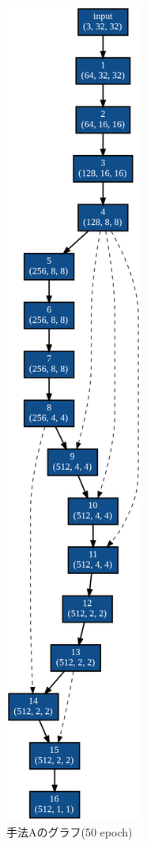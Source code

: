 \documentclass[twocolumn]{jarticle}     %
\begin{document}
\begin{figure}[tb]
\begin{minipage}{0.333\hsize}
\begin{center}
 		\caption{手法Aのグラフ(50 epoch)}
 		\label{fig:graph_s}
 	\end{center}
 \end{minipage}
 \begin{minipage}{0.333\hsize}
 	\begin{center}
 		\includegraphics[clip,scale=0.25]{graph_50_search_edge.png}

\end{center}
\end{minipage}
\end{figure}
\end{document}
